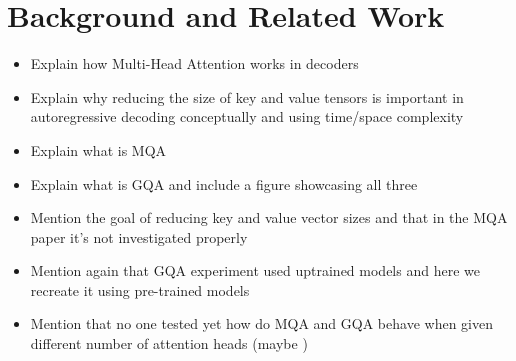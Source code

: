 \section{Background and Related Work}
\begin{itemize}
    \item Explain how Multi-Head Attention works in decoders
    \item Explain why reducing the size of key and value tensors is important in autoregressive decoding \cite{pope_efficiently_2022} \cite{shazeer_fast_2019} \cite{williams_roofline_2009} conceptually and using time/space complexity
    \item Explain what is MQA \cite{shazeer_fast_2019}
    \item Explain what is GQA and include a figure showcasing all three \cite{ainslie_gqa_2023}
    \item Mention the goal of reducing key and value vector sizes and that in the MQA paper it's not investigated properly 
    \item Mention again that GQA experiment used uptrained models and here we recreate it using pre-trained models
    \item Mention that no one tested yet how do MQA and GQA behave when given different number of attention heads (maybe \cite{michel_are_2019}) 
\end{itemize}




